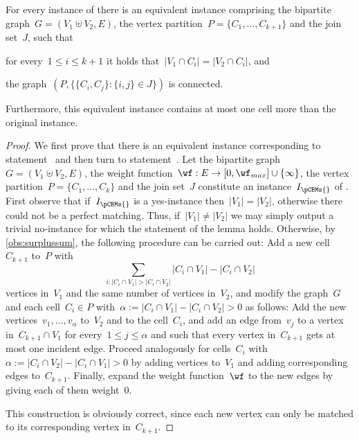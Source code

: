 \begin{lemma}\label{lem:cbmlegalized}
  For every instance of \pCBMs{} there is an equivalent instance comprising the bipartite graph~$G = (V_1 \uplus V_2, E)$, the vertex partition~$P = \{C_1, \ldots, C_{k+1}\}$ and the join set~$J$, such that
\begin{lemenum}
\item for every~$1 \leq i \leq k+ 1$ it holds that~$|V_1 \cap C_i| = |V_2 \cap C_i|$, and\label{enu:cl11}
\item the graph~$(P, \{\{C_i, C_j\}: \{i, j\} \in J\})$ is connected.\label{enu:cl12}
\end{lemenum}
Furthermore, this equivalent instance contains at most one cell more than the original instance.
\end{lemma}
\begin{proof}
  We first prove that there is an equivalent instance corresponding to statement~ and then turn to statement~.
  Let the bipartite graph~$G = (V_1 \uplus V_2, E)$, the weight function~$\wf:E \rightarrow [0, \wf_{max}]\cup \{\infty\}$, the vertex partition~$P = \{C_1, \ldots, C_k\}$ and the join set~$J$ constitute an instance~$I_\pCBMs{}$ of \pCBMs{}. First observe that if~$I_\pCBMs{}$ is a yes-instance then~$|V_1| = |V_2|$, otherwise there could not be a perfect matching. Thus, if~$|V_1| \neq |V_2|$ we may simply output a trivial no-instance for which the statement of the lemma holds. Otherwise, by \autoref{obs:surplussum}, the following procedure can be carried out: Add a new cell~$C_{k+1}$ to~$P$ with~\[{\sum_{i: |C_i \cap V_1| > |C_i \cap V_2|}} |C_i \cap V_1| - |C_i \cap V_2|\] vertices in~$V_1$ and the same number of vertices in~$V_2$, and modify the graph~$G$ and each cell~$C_i \in P$ with~$\alpha := |C_i \cap V_1| - |C_i \cap V_2| > 0$ as follows: Add the new vertices~$v_1, \ldots, v_\alpha$ to~$V_2$ and to the cell~$C_i$, and add an edge from~$v_j$ to a vertex in~$C_{k+1} \cap V_1$ for every~$1 \leq j \leq \alpha$ and such that every vertex in~$C_{k+1}$ gets at most one incident edge. Proceed analogously for cells~$C_i$ with~$\alpha := |C_i \cap V_2| - |C_i \cap V_1| > 0$ by adding vertices to~$V_1$ and adding corresponding edges to~$C_{k+1}$. Finally, expand the weight function~$\wf$ to the new edges by giving each of them weight~0.

This construction is obviously correct, since each new vertex can only be matched to its corresponding vertex in~$C_{k+1}$.


\end{proof}
